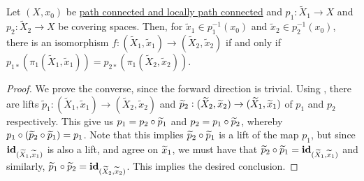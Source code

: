 \begin{theorem}
    Let $(X, x_0)$ be \ul{path connected and locally path connected} and $p_1:\widetilde X_1\to X$ and $p_2:\widetilde X_2\to X$ be covering spaces. Then, for $\widetilde x_1\in p_1^{-1}(x_0)$ and $\widetilde x_2\in p_2^{-1}(x_0)$, there is an isomorphism $f: (\widetilde X_1,\widetilde x_1)\to(\widetilde X_2,\widetilde x_2)$ if and only if $p_{1*}(\pi_1(\widetilde X_1,\widetilde x_1)) = p_{2*}(\pi_1(\widetilde{X}_2, \widetilde x_2))$.
\end{theorem}
\begin{proof}
    We prove the converse, since the forward direction is trivial. Using , there are lifts $\widetilde p_1: (\widetilde X_1,\widetilde x_1)\to(\widetilde X_2,\widetilde x_2)$ and $\widetilde{p}_2: (\widetilde{X}_2,\widetilde{x}_2)\to(\widetilde{X}_1,\widetilde{x}_1)$ of $p_1$ and $p_2$ respectively. This give us $p_1 = p_2\circ\widetilde{p}_1$ and $p_2 = p_1\circ\widetilde{p}_2$, whereby $p_1\circ(\widetilde{p}_2\circ\widetilde{p}_1) = p_1$. Note that this implies $\widetilde{p}_2\circ\widetilde{p}_1$ is a lift of the map $p_1$, but since $\mathbf{id}_{(\widetilde{X}_1,\widetilde{x}_1)}$ is also a lift, and agree on $\widetilde{x}_1$, we must have that $\widetilde{p}_2\circ\widetilde{p}_1 = \mathbf{id}_{(\widetilde{X}_1, \widetilde{x}_1)}$ and similarly, $\widetilde{p}_1\circ\widetilde{p}_2 = \mathbf{id}_{(\widetilde{X}_2,\widetilde{x}_2)}$. This implies the desired conclusion.
\end{proof}

